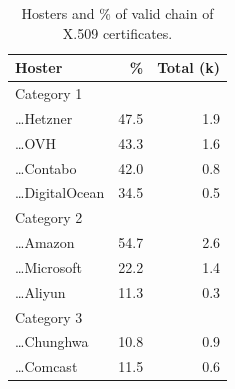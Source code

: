 \begin{table}
\centering
\small
\caption{Hosters and \% of valid chain of X.509 certificates.}
\begin{tabular}{lrr}
\toprule
\textbf{Hoster} & \textbf{\%} & \textbf{Total (k)} \\
\midrule
Category 1 & & \\
\ldots Hetzner & 47.5 & 1.9 \\
\ldots OVH & 43.3 & 1.6 \\
\ldots Contabo & 42.0 & 0.8 \\
\ldots DigitalOcean & 34.5 & 0.5 \\
Category 2 & & \\
\ldots Amazon & 54.7 & 2.6 \\
\ldots Microsoft & 22.2 & 1.4 \\
\ldots Aliyun & 11.3 & 0.3 \\
Category 3 & & \\
\ldots Chunghwa & 10.8 & 0.9 \\
\ldots Comcast & 11.5 & 0.6 \\
\bottomrule
\end{tabular}
\label{tab:hosting-valid-chains}
\end{table}